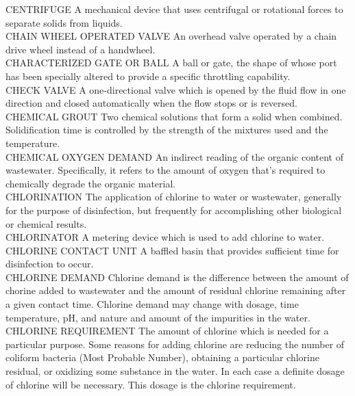 \documentclass{article}
\begin{document}
CENTRIFUGE
A mechanical device that uses centrifugal or rotational forces to separate solids from liquids.
\vspace{0.3cm}\\
CHAIN WHEEL OPERATED VALVE
An overhead valve operated by a chain drive wheel instead of a handwheel.
\vspace{0.3cm}\\
CHARACTERIZED GATE OR BALL
A ball or gate, the shape of whose port has been specially altered to provide a specific throttling capability.
\vspace{0.3cm}\\
CHECK VALVE
A one-directional valve which is opened by the fluid flow in one direction and closed automatically when the flow stops or is reversed.
\vspace{0.3cm}\\
CHEMICAL GROUT
Two chemical solutions that form a solid when combined. Solidification time is controlled by the strength of the mixtures used and the temperature. 
\vspace{0.3cm}\\
CHEMICAL OXYGEN DEMAND
An indirect reading of the organic content of wastewater. Specifically, it refers to the amount of oxygen that’s required to chemically degrade the organic material.
\vspace{0.3cm}\\
CHLORINATION
The application of chlorine to water or wastewater, generally for the purpose of disinfection, but frequently for accomplishing other biological or chemical results.
\vspace{0.3cm}\\
CHLORINATOR
A metering device which is used to add chlorine to water.
\vspace{0.3cm}\\
CHLORINE CONTACT UNIT
A baffled basin that provides sufficient time for disinfection to occur.
\vspace{0.3cm}\\
CHLORINE DEMAND
Chlorine demand is the difference between the amount of chorine added to wastewater and the amount of residual chlorine remaining after a given contact time. Chlorine demand may change with dosage, time temperature, pH, and nature and amount of the impurities in the water.
\vspace{0.3cm}\\
CHLORINE REQUIREMENT
The amount of chlorine which is needed for a particular purpose. Some reasons for adding chlorine are reducing the number of coliform bacteria (Most Probable Number), obtaining a particular chlorine residual, or oxidizing some substance in the water. In each case a definite dosage of chlorine will be necessary. This dosage is the chlorine requirement.
\end{document}
